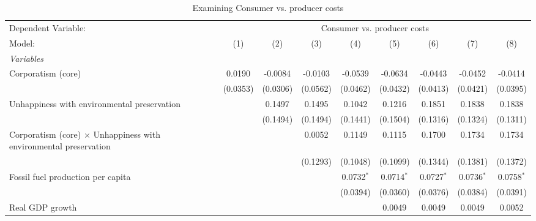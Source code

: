 
\begin{table}[htbp]
   \caption{Examining Consumer vs. producer costs}
   \centering
   \begin{tabular}{lcccccccc}
      \tabularnewline \midrule \midrule
      Dependent Variable: & \multicolumn{8}{c}{Consumer vs. producer costs}\\
      Model:                                                                   & (1)      & (2)      & (3)      & (4)          & (5)          & (6)          & (7)          & (8)\\  
      \midrule
      \emph{Variables}\\
      Corporatism (core)                                                       & 0.0190   & -0.0084  & -0.0103  & -0.0539      & -0.0634      & -0.0443      & -0.0452      & -0.0414\\   
                                                                               & (0.0353) & (0.0306) & (0.0562) & (0.0462)     & (0.0432)     & (0.0413)     & (0.0421)     & (0.0395)\\   
      Unhappiness with environmental preservation                              &          & 0.1497   & 0.1495   & 0.1042       & 0.1216       & 0.1851       & 0.1838       & 0.1838\\   
                                                                               &          & (0.1494) & (0.1494) & (0.1441)     & (0.1504)     & (0.1316)     & (0.1324)     & (0.1311)\\   
      Corporatism (core) $\times$ Unhappiness with environmental preservation  &          &          & 0.0052   & 0.1149       & 0.1115       & 0.1700       & 0.1734       & 0.1734\\   
                                                                               &          &          & (0.1293) & (0.1048)     & (0.1099)     & (0.1344)     & (0.1381)     & (0.1372)\\   
      Fossil fuel production per capita                                        &          &          &          & 0.0732$^{*}$ & 0.0714$^{*}$ & 0.0727$^{*}$ & 0.0736$^{*}$ & 0.0758$^{*}$\\   
                                                                               &          &          &          & (0.0394)     & (0.0360)     & (0.0376)     & (0.0384)     & (0.0391)\\   
      Real GDP growth                                                          &          &          &          &              & 0.0049       & 0.0049       & 0.0049       & 0.0052\\   

\end{tabular}
\end{table}
